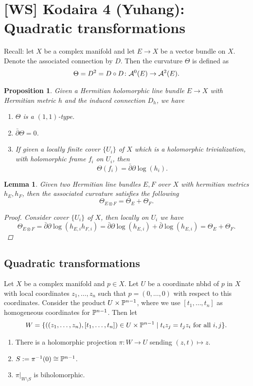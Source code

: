 \documentclass[A4paper, british, reqno]{amsart}
\theoremstyle{darkgreentheorem}
\newtheorem{lm}[thm]{Lemma}
\newtheorem{prop}[thm]{Proposition}
\theoremstyle{darkbluedefinition}
\theoremstyle{darkredexample}
\theoremstyle{remark}
\newcommand{\1}{\mathbbm{1}}
\newcommand{\ot}{\otimes}
\newcommand{\tms}{\times}
\begin{document}
\section{[WS] Kodaira 4 (Yuhang): Quadratic transformations}

Recall: let $X$ be a complex manifold and let $E\to X$ be a vector bundle on $X$.
Denote the associated connection by $D$.
Then the curvature $\Theta$ is defined as
\[ \Theta = D^{2} =D\circ D\colon \calA^{0}(E)\to \calA^{2}(E). \]

\begin{prop}
    Given a Hermitian holomorphic line bundle $E\to X$ with Hermitian metric $h$ and the induced connection $D_{h}$, we have
    \begin{enumerate}
	\item $\Theta$ is a $(1,1)$-type.
	\item $\bar{\partial} \Theta =0$.
	\item If given a locally finite cover $\{U_{i}\}$ of $X$ which is a holomorphic trivialization, with holomorphic frame $f_{i}$ on $U_{i}$, then
	    \[ \Theta(f_{i})=\bar{\partial}\partial \log(h_{i}). \]
    \end{enumerate}
\end{prop}

\begin{lm}
    Given two Hermitian line bundles $E,F$ over $X$ with hermitian metrics $h_{E},h_{F}$, then the associated curvature satisfies the following
    \[ \Theta_{E\ot F}=\Theta_{E}+\Theta_{F}. \]
    \begin{proof}
	Consider cover $\{U_{i}\}$ of $X$, then locally on $U_{i}$ we have
	\[ \Theta_{E\ot F}=\bar{\partial}\partial \log(h_{E,i}h_{F,i})=\bar{\partial}\partial \log(h_{E,i})+\bar{\partial}\log(h_{E,i})=\Theta_{E}+\Theta_{F}.\]
    \end{proof}
\end{lm}

\subsection{Quadratic transformations}

Let $X$ be a complex manifold and $p\in X$.
Let $U$ be a coordinate nbhd of $p$ in $X$ with local coordinates $z_{1},\ldots,z_{n}$ such that $p=(0,\ldots,0)$ with respect to this coordinates.
Consider the product $U\tms \P^{n-1}$, where we use $[t_{1},\ldots,t_{n}]$ as homogeneous coordinates for $\P^{n-1}$.
Then let
\[ W=\{ ((z_{1},\ldots,z_{n}),[t_{1},\ldots,t_{n}])\in U\tms \P^{n-1} \mid t_{i}z_{j}=t_{j}z_{i} \text{ for all } i,j\}.\]
\begin{enumerate}
    \item There is a holomorphic projection $\pi\colon W\to U$ sending $(z,t)\mapsto z$.
    \item $S:=\pi^{-1}(0)\cong \P^{n-1}$.
    \item $\pi|_{W\setminus S}$ is biholomorphic.
\end{enumerate}
\end{document}
